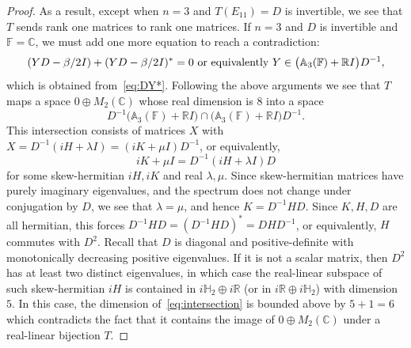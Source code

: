 \documentclass[11pt]{article}
\numberwithin{equation}{section}
\def\IF{{\mathbb F}}
\def\IC{{\mathbb C}}
\def\IR{{\mathbb R}}
\def\IA{{\mathbb A}}
\def\IH{{\mathbb H}}
\begin{document}
\begin{proof}
As a result, except when $n = 3$ and $T(E_{11}) = D$ is invertible,
we see that  $T$ sends rank one matrices to rank one matrices.
If $n=3$ and $D$ is invertible and $\IF=\IC$, we must add one more equation to reach a contradiction:
\begin{equation}\label{eq:additional}
 (YD-\beta/2 I)+(YD-\beta /2 I)^\ast=0\hbox{ or equivalently } Y\in \bigl(\IA_3(\IF)+\IR I\bigr)D^{-1},
\end{equation}
which is obtained from~\eqref{eq:DY*}. Following the above arguments we see that $T$ maps a space $0\oplus M_{2}(\IC)$ whose real dimension is $8$ into a space
\begin{equation}\label{eq:intersection}
D^{-1}\bigl(\IA_3(\IF)+\IR I\bigr)\cap \bigl(\IA_3(\IF)+\IR I\bigr)D^{-1}.
\end{equation}
This intersection consists of matrices $X$ with $X=D^{-1}(i H+\lambda I) =(iK+\mu I)D^{-1}$, or equivalently,
$$iK+\mu I=D^{-1}(iH+\lambda I)D$$
for some skew-hermitian $iH,iK$ and real $
\lambda,\mu$.  Since skew-hermitian matrices have purely imaginary  eigenvalues, and the spectrum does not change under conjugation by $D$, we see that $\lambda=\mu$, and hence $K=D^{-1}HD$. Since $K,H,D$ are all hermitian, this forces $D^{-1}HD=(D^{-1}HD)^\ast= DHD^{-1}$, or equivalently, $H$ commutes with $D^2$. Recall that $D$ is diagonal and positive-definite with monotonically decreasing positive eigenvalues. If it is not a scalar matrix, then $D^2$ has at least two distinct eigenvalues,  in which case the real-linear subspace of such skew-hermitian $iH$ is contained in $i\IH_2\oplus i\IR$ (or in $i\IR\oplus i\IH_2$) with dimension $5$. In this case, the dimension of~\eqref{eq:intersection} is bounded above by $5+1=6$ which contradicts the fact that it contains the image of $0\oplus M_2(\IC)$ under a real-linear bijection $T$.


\end{proof}
\end{document}

